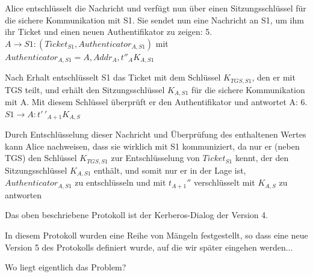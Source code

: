 \documentclass[a4paper]{article}
\begin{document}
\begin{multicols}{3}
\begin{itemize*}
            \item Alice entschlüsselt die Nachricht und verfügt nun über einen Sitzungsschlüssel für die sichere Kommunikation mit S1. Sie sendet nun eine Nachricht an S1, um ihm ihr Ticket und einen neuen Authentifikator zu zeigen: 5. $A\rightarrow S1:(Ticket_{S1}, Authenticator_{A,S1})$ mit $Authenticator_{A,S1}={A,Addr_A, t''_{A}}{K_{A,S1}}$
            \item Nach Erhalt entschlüsselt S1 das Ticket mit dem Schlüssel $K_{TGS,S1}$, den er mit TGS teilt, und erhält den Sitzungsschlüssel $K_{A,S1}$ für die sichere Kommunikation mit A. Mit diesem Schlüssel überprüft er den Authentifikator und antwortet A: 6. $S1\rightarrow A:{t'\,'_{A+1}}{K_{A,S}}$
            \item Durch Entschlüsselung dieser Nachricht und Überprüfung des enthaltenen Wertes kann Alice nachweisen, dass sie wirklich mit S1 kommuniziert, da nur er (neben TGS) den Schlüssel $K_{TGS,S1}$ zur Entschlüsselung von $Ticket_{S1}$ kennt, der den Sitzungsschlüssel $K_{A,S1}$ enthält, und somit nur er in der Lage ist, $Authenticator_{A,S1}$ zu entschlüsseln und mit $t_{A+1}''$ verschlüsselt mit $K_{A,S}$ zu antworten
            \item Das oben beschriebene Protokoll ist der Kerberos-Dialog der Version 4.
            \begin{itemize*}
                  \item In diesem Protokoll wurden eine Reihe von Mängeln festgestellt, so dass eine neue Version 5 des Protokolls definiert wurde, auf die wir später eingehen werden...
                  \item Wo liegt eigentlich das Problem?
            \end{itemize*}
      \end{itemize*}


\end{multicols}
\end{document}
